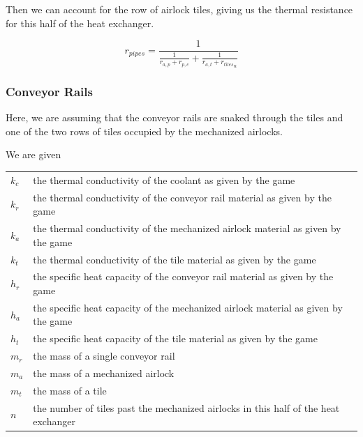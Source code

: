 \documentclass{article}
\numberwithin{equation}{subsection}
\theoremstyle{remark}
\newenvironment{definitiontable}{
\renewcommand{\arraystretch}{1.5}
\begin{tabular}{lp{0.8\textwidth}}
}
{
\end{tabular}
\renewcommand{\arraystretch}{1.0}
}
\begin{document}
Then we can account for the row of airlock tiles, giving us the thermal resistance for this half of the heat exchanger.

\begin{equation}
r_{pipes} = \frac{1}{\frac{1}{r_{a,p} + r_{p,c}} + \frac{1}{r_{a,t} + {r_{tiles}}_{n}}}
\end{equation}

\subsubsection{Conveyor Rails}

Here, we are assuming that the conveyor rails are snaked through the tiles and one of the two rows of tiles occupied by the mechanized airlocks.

We are given

\begin{definitiontable}
\(k_{c}\) & the thermal conductivity of the coolant as given by the game \\

\(k_{r}\) & the thermal conductivity of the conveyor rail material as given by the game \\

\(k_{a}\) & the thermal conductivity of the mechanized airlock material as given by the game \\

\(k_{t}\) & the thermal conductivity of the tile material as given by the game \\

\(h_{r}\) & the specific heat capacity of the conveyor rail material as given by the game \\

\(h_{a}\) & the specific heat capacity of the mechanized airlock material as given by the game \\

\(h_{t}\) & the specific heat capacity of the tile material as given by the game \\

\(m_{r}\) & the mass of a single conveyor rail \\

\(m_{a}\) & the mass of a mechanized airlock \\

\(m_{t}\) & the mass of a tile \\

\(n\) & the number of tiles past the mechanized airlocks in this half of the heat exchanger
\end{definitiontable}
\end{document}
